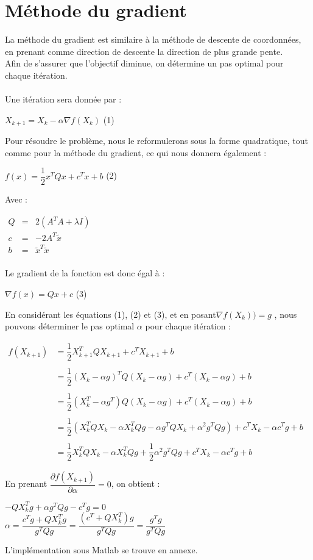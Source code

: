 \documentclass[12pt, a4paper]{report}
\begin{document}
\section{Méthode du gradient}
La méthode du gradient est similaire à la méthode de descente de coordonnées, en prenant comme direction de descente la direction de plus grande pente.\\
Afin de s'assurer que l'objectif diminue, on détermine un pas optimal pour chaque itération.\\
\\Une itération sera donnée par :
\begin{center}
$X_{k+1}=X_k - \alpha \nabla f(X_k)$ (1)
\end{center}
Pour résoudre le problème, nous le reformulerons sous la forme quadratique, tout comme pour la méthode du gradient, ce qui nous donnera également :
\begin{center}
$f(x) = \dfrac{1}{2}x^TQx + c^Tx + b$ (2)
\end{center}
Avec :
\begin{flushleft}
$\begin{array}{rcl}
Q & = & 2(A^TA + \lambda I) \\
c & = & -2A^T\tilde{x} \\
b & = & \tilde{x}^T\tilde{x} \\
\end{array}$
\end{flushleft}
Le gradient de la fonction est donc égal à :
\begin{center}
$\nabla f(x) = Qx + c$ (3)
\end{center}
En considérant les équations (1), (2) et (3), et en posant$\nabla f(X_k)) = g$ , nous pouvons déterminer le pas optimal $\alpha$ pour chaque itération :
\begin{center}
$\begin{array}{rl}
f(X_{k+1}) & = \dfrac{1}{2}X_{k+1}^TQX_{k+1} + c^TX_{k+1} + b\\
\\& = \dfrac{1}{2}(X_k - \alpha g)^TQ(X_k - \alpha g) + c^T(X_k - \alpha g) + b\\
\\& = \dfrac{1}{2}(X_k^T - \alpha g^T)Q(X_k - \alpha g) + c^T(X_k - \alpha g) + b\\
\\& = \dfrac{1}{2}(X_k^T Q X_k- \alpha X_k^T Q g - \alpha g^T Q X_k + \alpha^2g^T Q g) + c^T X_k - \alpha c^T g + b\\
\\& = \dfrac{1}{2}X_k^T Q X_k- \alpha X_k^T Q g +\dfrac{1}{2}\alpha^2g^T Q g + c^T X_k - \alpha c^T g + b
\end{array}$
\bigbreak
\end{center}
En prenant $\dfrac{\partial f(X_{k+1})}{\partial \alpha} = 0$, on obtient :
\begin{center}
$ - Q X_k^T g + \alpha g^TQ g - c^T g = 0$\\
\bigbreak
$\alpha = \dfrac{c^T g + Q X_k^T g}{g^TQ g} = \dfrac{(c^T + Q X_k^T)g}{g^TQ g} = \dfrac{g^T g}{g^TQ g}$\\
\end{center}
\bigbreak
\noindent
L'implémentation sous Matlab se trouve en annexe.
\end{document}
